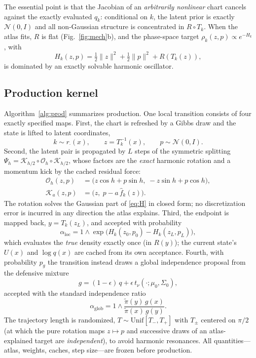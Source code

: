 \documentclass[10pt,journal,compsoc]{IEEEtran}
\begin{document}
The essential point is that the Jacobian of an \emph{arbitrarily nonlinear}
chart cancels against the exactly evaluated $q_k$: conditional on $k$, the
latent prior is exactly $\mathcal N(0,I)$ and all non-Gaussian structure is
concentrated in $R\circ T_k$. When the atlas fits, $R$ is flat
(Fig.~\ref{fig:mech}b), and the phase-space target
$\rho_k(z,p)\propto e^{-H_k}$, with
\begin{equation}
H_k(z,p)=\tfrac12\|z\|^2+\tfrac12\|p\|^2+R(T_k(z)),
\label{eq:H}
\end{equation}
is dominated by an exactly solvable harmonic oscillator.

\subsection{Production kernel}\label{sec:kernel}
Algorithm~\ref{alg:prod} summarizes production. One local transition
consists of four exactly specified maps. First, the chart is refreshed by a
Gibbs draw and the state is lifted to latent coordinates,
\begin{equation}
k\sim r_\cdot(x),\qquad z=T_k^{-1}(x),\qquad p\sim\mathcal N(0,I).
\end{equation}
Second, the latent pair is propagated by $L$ steps of the symmetric
splitting $\Psi_h=\mathcal K_{h/2}\circ\mathcal O_h\circ\mathcal K_{h/2}$,
whose factors are the \emph{exact} harmonic rotation and a momentum kick by
the cached residual force:
\begin{align}
\mathcal O_h(z,p)&=\bigl(z\cos h+p\sin h,\;-z\sin h+p\cos h\bigr),
\label{eq:rot}\\
\mathcal K_{a}(z,p)&=\bigl(z,\;p-a\,\hat f_k(z)\bigr).
\label{eq:kick}
\end{align}
The rotation solves the Gaussian part of \eqref{eq:H} in closed form; no
discretization error is incurred in any direction the atlas explains.
Third, the endpoint is mapped back, $y=T_k(z_L)$, and accepted with
probability
\begin{equation}
\alpha_{\mathrm{loc}}
=1\wedge\exp\bigl(H_k(z_0,p_0)-H_k(z_L,p_L)\bigr),
\label{eq:mh}
\end{equation}
which evaluates the \emph{true} density exactly once (in $R(y)$); the
current state's $U(x)$ and $\log q(x)$ are cached from its own acceptance.
Fourth, with probability $p_g$ the transition instead draws a global
independence proposal from the defensive mixture
\begin{equation}
g=(1-\epsilon)\,q+\epsilon\, t_\nu(\cdot;\mu_0,\Sigma_0),
\label{eq:defensive}
\end{equation}
accepted with the standard independence ratio
\begin{equation}
\alpha_{\mathrm{glob}}
=1\wedge\frac{\tilde\pi(y)\,g(x)}{\tilde\pi(x)\,g(y)}.
\label{eq:imh}
\end{equation}
The trajectory length is randomized, $T\sim\mathrm{Unif}[T_-,T_+]$ with
$T_\pm$ centered on $\pi/2$ (at which the pure rotation maps $z\mapsto p$
and successive draws of an atlas-explained target are \emph{independent}),
to avoid harmonic resonances. All quantities---atlas, weights, caches, step
size---are frozen before production.
\end{document}
